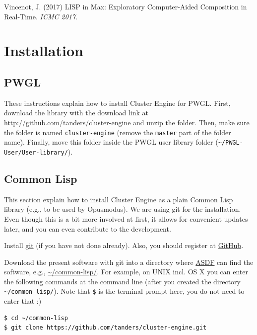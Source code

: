 Vincenot, J. (2017) LISP in Max: Exploratory Computer-Aided Composition in Real-Time. \emph{ICMC 2017}.  


\section*{Installation}
\label{sec:org4613aef}

\subsection*{PWGL}
\label{sec:orgd550f20}

These instructions explain how to install Cluster Engine for PWGL. First, download the library with the download link at \url{http://github.com/tanders/cluster-engine} and unzip the folder. Then, make sure the folder is named \texttt{cluster-engine} (remove the \texttt{master} part of the folder name). Finally, move this folder inside the PWGL user library folder (\texttt{\textasciitilde{}/PWGL-User/User-library/}). 


\subsection*{Common Lisp}
\label{sec:orgad117db}

This section explain how to install Cluster Engine as a plain Common Lisp library (e.g., to be used by Opusmodus). We are using git for the installation. Even though this is a bit more involved at first, it allows for convenient updates later, and you can even contribute to the development. 

Install \href{https://git-scm.com}{git} (if you have not done already). Also, you should register at \href{https://github.com}{GitHub}.

Download the present software with git into a directory where \href{https://common-lisp.net/project/asdf/}{ASDF} can find the software, e.g., \href{https://common-lisp.net/project/asdf/asdf/Quick-start-summary.html\#Quick-start-summary}{\textasciitilde{}/common-lisp/}. For example, on UNIX incl. OS X you can enter the following commands at the command line (after you created the directory \texttt{\textasciitilde{}/common-lisp/}). Note that \texttt{\$} is the terminal prompt here, you do not need to enter that :)

\lstset{language=bash,label= ,caption= ,captionpos=b,numbers=none}
\begin{lstlisting}
$ cd ~/common-lisp
$ git clone https://github.com/tanders/cluster-engine.git
\end{lstlisting}

